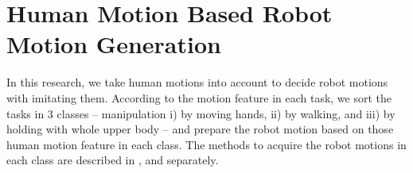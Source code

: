 \section{Human Motion Based Robot Motion Generation}
\label{sec:motion_generator}
In this research, we take human motions into account to decide robot motions with imitating them. According to the motion feature in each task, we sort the tasks in 3 classes -- manipulation i) by moving hands, ii) by walking, and iii) by holding with whole upper body -- and prepare the robot motion based on those human motion feature in each class. %
The methods to acquire the robot motions in each class are described in ,  and  separately.



